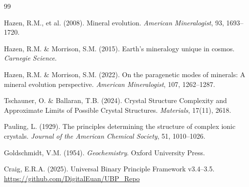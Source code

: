 \documentclass[11pt,a4paper]{article}
\begin{document}
\begin{thebibliography}{99}

Hazen, R.M., et al. (2008). Mineral evolution. \textit{American Mineralogist}, 93, 1693--1720.

Hazen, R.M. \& Morrison, S.M. (2015). Earth's mineralogy unique in cosmos. \textit{Carnegie Science}.

Hazen, R.M. \& Morrison, S.M. (2022). On the paragenetic modes of minerals: A mineral evolution perspective. \textit{American Mineralogist}, 107, 1262--1287.

Tschauner, O. \& Ballaran, T.B. (2024). Crystal Structure Complexity and Approximate Limits of Possible Crystal Structures. \textit{Materials}, 17(11), 2618.

Pauling, L. (1929). The principles determining the structure of complex ionic crystals. \textit{Journal of the American Chemical Society}, 51, 1010--1026.

Goldschmidt, V.M. (1954). \textit{Geochemistry}. Oxford University Press.

Craig, E.R.A. (2025). Universal Binary Principle Framework v3.4--3.5. \url{https://github.com/DigitalEuan/UBP_Repo}

\end{thebibliography}
\end{document}
